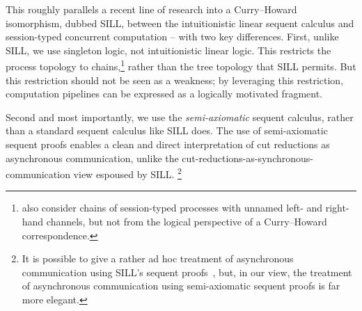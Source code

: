 This roughly parallels a recent line of research into a Curry--Howard isomorphism, dubbed \acs{SILL}, between the intuitionistic linear sequent calculus and session-typed concurrent computation\autocites{Caires+:MSCS16}{Caires+:TLDI12} -- with two key differences.
First, unlike \ac{SILL}, we use singleton logic, not intuitionistic linear logic.
This restricts the process topology to chains,\footnote{\Textcite{Dezani-Ciancaglini+:PLACES14} also consider chains of session-typed processes with unnamed left- and right-hand channels, but not from the logical perspective of a Curry--Howard correspondence.} rather than the tree topology that \ac{SILL} permits.
But this restriction should not be seen as a weakness;
by leveraging this restriction, computation pipelines can be expressed as a logically motivated fragment.

Second and most importantly, we use the \emph{semi-axiomatic} sequent calculus, rather than a standard sequent calculus like \ac{SILL} does.
The use of semi-axiomatic sequent proofs enables a clean and direct interpretation of cut reductions as asynchronous communication, unlike the cut-reductions-as-syn\-chro\-nous-communication view espoused by \ac{SILL}.%
\footnote{It is possible to give a rather ad hoc treatment of asynchronous communication using \ac{SILL}'s sequent proofs~\parencite{DeYoung+:CSL12}, but, in our view, the treatment of asynchronous communication using semi-axiomatic sequent proofs is far more elegant.}







